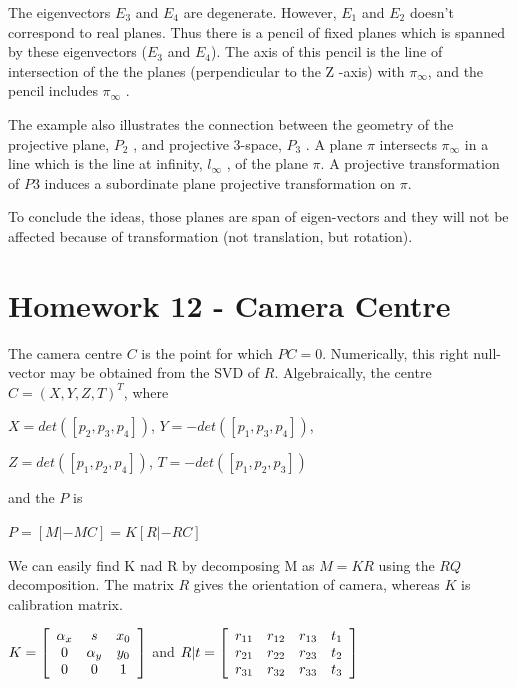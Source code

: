 \documentclass[]{article}
\begin{document}
\vspace{0.5em}

The eigenvectors $E_3$ and $E_4$ are degenerate. However, $E_1$ and $E_2$ doesn't correspond to real planes. Thus there is a pencil of fixed planes which is spanned by these eigenvectors ($E_3$ and $E_4$). The axis of this pencil is the line of intersection of the the planes (perpendicular to the Z -axis) with $\pi _ \infty$, and the pencil includes $\pi _ \infty$ .

The example also illustrates the connection between the geometry of the projective
plane, $P_2$ , and projective 3-space, $P_3$ . A plane $\pi$ intersects $\pi _ \infty$ in a line which is the line at infinity,  $l_ \infty$ , of the plane $\pi$. A projective transformation of $P3$ induces a subordinate plane projective transformation on $\pi$.

To conclude the ideas, those planes are span of eigen-vectors and they will not be affected because of transformation (not translation, but rotation).

\section{Homework 12 - Camera Centre }

The camera centre $C$ is the point for which $PC = 0$. Numerically, this right null-vector may be obtained from the SVD of $R$. Algebraically, the centre $C = (X, Y,Z,T)^T$, where 

\centerline {
	$X=det([p_2, p_3, p_4])$, $Y=-det([p_1, p_3, p_4])$, 
}

\centerline {
	$Z=det([p_1, p_2, p_4])$, $T=-det([p_1, p_2, p_3])$
}

and the $P$ is 

\centerline {
	$P=[M | -MC] = K[R | -RC ]$
}

We can easily find K nad R by decomposing M as $M = KR$ using the $RQ$ decomposition. The matrix $R$ gives the orientation of camera, whereas $K$ is calibration matrix. 

\centerline {
		$K = \left[ {\begin{array}{*{20}c}
		\alpha _x & s & x_0\\
		0 & \alpha _y & y_0 \\ 
		0 & 0 & 1   
		\end{array} } \right]$ and $R|t = \left[ {\begin{array}{*{20}c}
		r_{11} & r_{12} & r_{13} & t_1 \\
		r_{21} & r_{22} & r_{23} & t_2 \\ 
		r_{31} & r_{32} & r_{33} & t_3    
		\end{array} } \right]$
}
\end{document}
